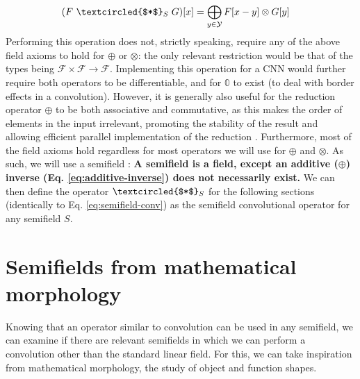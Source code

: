 \documentclass[a4paper, 12pt]{report}
\begin{document}
\begin{align}
	(F ~\textcircled{$*$}_S\; G)[x] &=\bigoplus_{y\in \mathcal{Y}} F[x-y] \otimes G[y] \label{eq:semifield-conv}
\end{align}
\noindent
Performing this operation does not, strictly speaking, require any of the above field axioms to hold for $\oplus$ or $\otimes$: the only relevant restriction would be that of the types being $\mathcal{F}\times\mathcal{F}\rightarrow\mathcal{F}$. Implementing this operation for a CNN would further require both operators to be differentiable, and for $\mathbb{0}$ to exist (to deal with border effects in a convolution). However, it is generally also useful for the reduction operator $\oplus$ to be both associative and commutative, as this makes the order of elements in the input irrelevant, promoting the stability of the result and allowing efficient parallel implementation of the reduction \cite{ppad}. Furthermore, most of the field axioms hold regardless for most operators we will use for $\oplus$ and $\otimes$. As such, we will use a semifield \cite{bellaardaxiomatic}:
\textbf{A semifield is a field, except an additive ($\oplus$) inverse (Eq. \ref{eq:additive-inverse}) does not necessarily exist.}
We can then define the operator $\textcircled{$*$}_S$ for the following sections (identically to Eq. \ref{eq:semifield-conv}) as the semifield convolutional operator for any semifield $S$.

\section{Semifields from mathematical morphology}
Knowing that an operator similar to convolution can be used in any semifield, we can examine if there are relevant semifields in which we can perform a convolution other than the standard linear field. For this, we can take inspiration from mathematical morphology, the study of object and function shapes.
\end{document}
